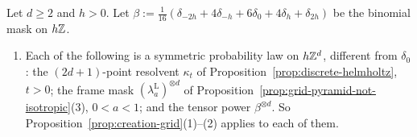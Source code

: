 \begin{proposition}
\label{prop:creation-grid-masks}
\leanok
Let $d \ge 2$ and $h > 0$. Let $\beta := \tfrac{1}{16}(\delta_{-2h} + 4\delta_{-h} + 6\delta_0 +
4\delta_h + \delta_{2h})$ be the binomial mask on $h\mathbb{Z}$.
\begin{enumerate}
\item Each of the following is a symmetric probability law on $h\mathbb{Z}^d$, different from
$\delta_0$: the $(2d+1)$-point resolvent $\kappa_t$ of
Proposition~\ref{prop:discrete-helmholtz}, $t > 0$; the frame mask
$(\lambda^{\mathrm L}_a)^{\otimes d}$ of Proposition~\ref{prop:grid-pyramid-not-isotropic}(3),
$0 < a < 1$; and the tensor power $\beta^{\otimes d}$. So
Proposition~\ref{prop:creation-grid}(1)--(2) applies to each of them.

\end{enumerate}
\end{proposition}
